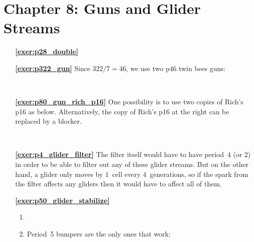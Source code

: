 \hypertarget{solutions_glider_guns}{}\label{solutions_glider_guns}
\section*{Chapter 8: Guns and Glider Streams}
\renewcommand{\chapterfolder}{glider_guns/}

\begin{multicols}{2}
	\begin{itemize}[leftmargin=0em]
		\item[\bf\color{ocre}\sffamily\ref{exer:p28_double}] \\
		
		
		\item[\bf\color{ocre}\sffamily\ref{exer:p322_gun}] Since $322/7 = 46$, we use two p$46$ twin bees guns:
		\begin{center}
			\\
		\end{center}
		
		
		\item[\bf\color{ocre}\sffamily\ref{exer:p80_gun_rich_p16}] One possibility is to use two copies of Rich's p16 as below. Alternatively, the copy of Rich's p16 at the right can be replaced by a blocker.
		\begin{center}
			\\
		\end{center}
		
		
		\item[\bf\color{ocre}\sffamily\ref{exer:p4_glider_filter}] The filter itself would have to have period~$4$ (or $2$) in order to be able to filter out any of these glider streams. But on the other hand, a glider only moves by $1$~cell every $4$~generations, so if the spark from the filter affects any gliders then it would have to affect all of them.\\
		
		
		\item[\bf\color{ocre}\sffamily\ref{exer:p50_glider_stabilize}] \begin{enumerate}[leftmargin=1.5em,label=\bf\color{ocre}(\alph*)]
			\item {} \\
			
			\item Period~5 bumpers are the only ones that work:
			\begin{center}
				 \\
			\end{center}
		\end{enumerate}
	\end{itemize}
\end{multicols}





